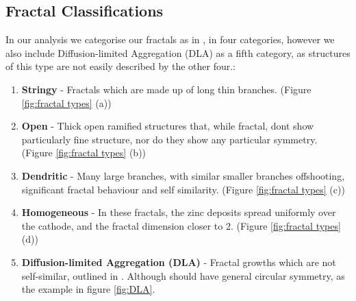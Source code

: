 \documentclass{article}
\theoremstyle{definition}
\theoremstyle{remark}
\begin{document}
\subsection{Fractal Classifications}\label{sec:fractalclassifications}
\indent In our analysis we categorise our fractals as in \cite{PhysRevLett.56.1260}, in four categories, however we also include Diffusion-limited Aggregation (DLA) as a fifth category, as structures of this type are not easily described by the other four.:
\begin{enumerate}
        \item \textbf{Stringy} - Fractals which are made up of long thin branches. (Figure \ref{fig:fractal types} (a))
        \item \textbf{Open} - Thick open ramified structures that, while fractal, dont show particularly fine structure, nor do they show any particular symmetry. (Figure \ref{fig:fractal types} (b))
        \item \textbf{Dendritic} - Many large branches, with similar smaller branches offshooting, significant fractal behaviour and self similarity. (Figure \ref{fig:fractal types} (c))
        \item \textbf{Homogeneous} - In these fractals, the zinc deposits spread uniformly over the cathode, and the fractal dimension closer to 2. (Figure \ref{fig:fractal types} (d))
        \item \textbf{Diffusion-limited Aggregation (DLA)} - Fractal growths which are not self-similar, outlined in \cite{1981PhRvL..47.1400W}. Although should have general circular symmetry, as the example in figure \ref{fig:DLA}.
\end{enumerate}
\end{document}
